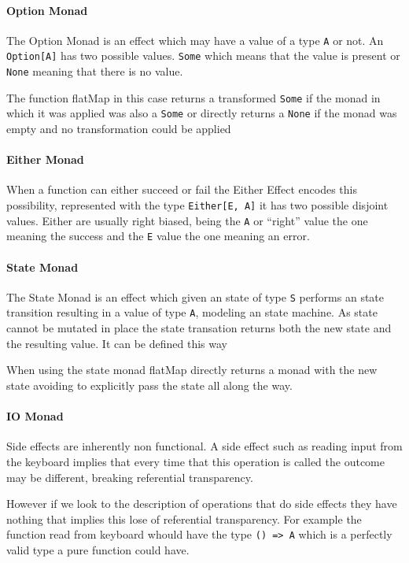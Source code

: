 \documentclass[../main.tex]{subfiles}
\begin{document}
\paragraph{Option Monad}
The Option Monad is an effect which may have a value of a type \texttt{A} or
not. An \texttt{Option[A]} has two possible values. \texttt{Some} which means
that the value is present or \texttt{None} meaning that there is no value.

The function flatMap in this case returns a transformed \texttt{Some} if the monad in which
it was applied was also a \texttt{Some} or directly returns a \texttt{None} if
the monad was empty and no transformation could be applied

\paragraph{Either Monad}
When a function can either succeed or fail the Either Effect encodes this
possibility, represented with the type \texttt{Either[E, A]} it has two possible
disjoint values. Either are usually right biased, being the \texttt{A} or
``right'' value the one meaning the success and the \texttt{E} value the one
meaning an error.

\paragraph{State Monad}
The State Monad is an effect which given an state of type \texttt{S} performs an state
transition resulting in a value of type \texttt{A}, modeling an state machine.
As state cannot be mutated in place the state transation returns both the new
state and the resulting value. It can be defined this way

When using the state monad flatMap directly returns a monad with the new state
avoiding to explicitly pass the state all along the way.

\paragraph{IO Monad}
Side effects are inherently non functional. A side effect such as reading input
from the keyboard implies that every time that this operation is called the
outcome may be different, breaking referential transparency.

However if we look to the description of operations that do side effects they
have nothing that implies this lose of referential transparency. For example
the function read from keyboard whould have the type \texttt{() => A} which is a
perfectly valid type a pure function could have.
\end{document}
